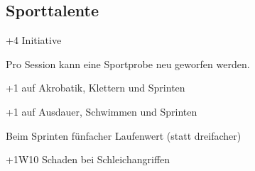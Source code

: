 \documentclass[../../Heldenanleitung2]{subfiles}
\begin{document}
\subsection{Sporttalente}

\begin{multicols}{2}

\begin{tcolorbox}[title={Verbesserte Initiative},colbacktitle=green, coltitle=black]    
   +4 Initiative
\end{tcolorbox}

\begin{tcolorbox}[title={Sportlich},colbacktitle=green, coltitle=black]    
   Pro Session kann eine Sportprobe neu geworfen werden.
\end{tcolorbox}

\begin{tcolorbox}[title={Akrobat},colbacktitle=green, coltitle=black]    
   +1 auf Akrobatik, Klettern und Sprinten
\end{tcolorbox}

\begin{tcolorbox}[title={Athlet},colbacktitle=green, coltitle=black]    
   +1 auf Ausdauer, Schwimmen und Sprinten
\end{tcolorbox}


\begin{tcolorbox}[title={Rennen},colbacktitle=green, coltitle=black]    
   Beim Sprinten fünfacher Laufenwert (statt dreifacher)
\end{tcolorbox}


\begin{tcolorbox}[title={Meuchler},colbacktitle=green, coltitle=black]    
   +1W10 Schaden bei Schleichangriffen
\end{tcolorbox}

\end{multicols}
\end{document}

